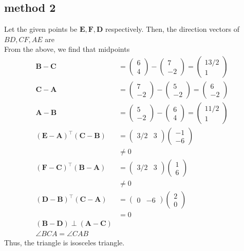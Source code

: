 \documentclass[10pt, a4paper]{article}
\providecommand{\brak}[1]{\ensuremath{\left(#1\right)}}
\newcommand{\myvec}[1]{\ensuremath{\begin{pmatrix}#1\end{pmatrix}}}
\let\vec\mathbf
\begin{document}
\subsection{method 2} Let the given points be $\vec{E}, \vec{F}, \vec{D}$ respectively. 
 Then, the direction vectors of  $BD ,CF,AE$ are
 \\
From the above,  we find that midpoints
\\
\begin{align}
\vec{B}-\vec{C}&= \myvec{6 \\ 4}-\myvec{7 \\-2} = \myvec{13/2 \\ 1}
\\
\vec{C}-\vec{A}&= \myvec{7 \\-2}-\myvec{5 \\-2} = \myvec{6 \\ -2}
\\
\vec{A}-\vec{B}&= \myvec{5 \\ -2} -\myvec{6 \\4} = \myvec{11/2 \\ 1}\
\
\\
\brak{\vec{E}-\vec{A}}^{\top}\brak{\vec{C}-\vec{B}}&= \myvec{3/2 & 3}\myvec{-1 \\ -6}\\
&\neq0\\
\brak{\vec{F}-\vec{C}}^{\top}\brak{\vec{B}-\vec{A}}&= \myvec{3/2 & 3}\myvec{1 \\ 6}\\
&\neq 0\\
\brak{\vec{D}-\vec{B}}^{\top}\brak{\vec{C}-\vec{A}}&= \myvec{0 & -6}\myvec{2 \\ 0}\\
&=0 \\
\brak{\vec{B} -\vec{D}}\perp \brak{\vec{A} -\vec{C}}\\
\angle BCA = \angle CAB  
\end{align}
Thus, the triangle is isosceles triangle.
 
\end{document}
